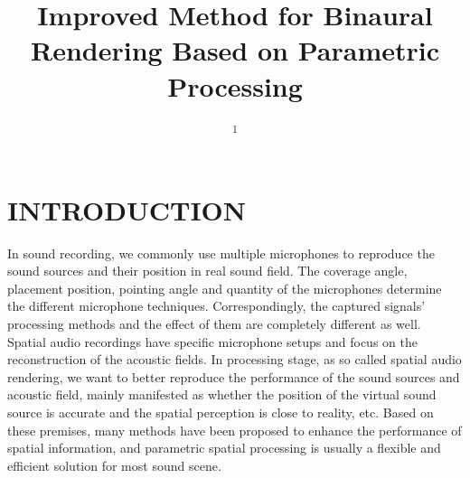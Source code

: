 \documentclass[10pt, a4paper, twocolumn]{article} %
\title{Improved Method for Binaural Rendering Based on Parametric Processing} %
\author{
	\authorstyle{Chuhan Qiu\textsuperscript{1}} %
	\newline\newline %
	\textsuperscript{1}\institution{Communication University of China, Beijing, China}\\ %
}
\date{} %
\begin{document}
\maketitle %

\thispagestyle{firstpage} %




\section{INTRODUCTION}

In sound recording, we commonly use multiple microphones to reproduce the sound sources and their position in real sound field. The coverage angle, placement position, pointing angle and quantity of the microphones determine the different microphone techniques. Correspondingly, the captured signals' processing methods and the effect of them are completely different as well. Spatial audio recordings have specific microphone setups and focus on the reconstruction of the acoustic fields. In processing stage, as so called spatial audio rendering, we want to better reproduce the performance of the sound sources and acoustic field, mainly manifested as whether the position of the virtual sound source is accurate and the spatial perception is close to reality, etc. Based on these premises, many methods have been proposed to enhance the performance of spatial information, and parametric spatial processing is usually a flexible and efficient solution for most sound scene.
\end{document}
